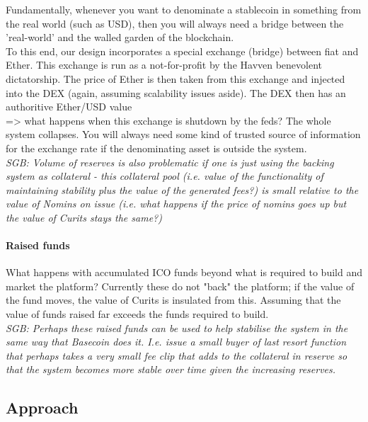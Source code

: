 \documentclass{article}
\begin{document}
\noindent Fundamentally, whenever you want to denominate a stablecoin in something from the real world (such as USD), then you will always need a bridge between the 'real-world' and the walled garden of the blockchain. \\

\noindent To this end, our design incorporates a special exchange (bridge) between fiat and Ether. This exchange is run as a not-for-profit by the Havven benevolent dictatorship. The price of Ether is then taken from this exchange and injected into the DEX (again, assuming scalability issues aside). The DEX then has an authoritive Ether/USD value  \\

\noindent => what happens when this exchange is shutdown by the feds? The whole system collapses. You will always need some kind of trusted source of information for the exchange rate if the denominating asset is outside the system. \\

\noindent \textit{SGB: Volume of reserves is also problematic if one is just using the backing system as collateral - this collateral pool (i.e. value of the functionality of maintaining stability plus the value of the generated fees?) is small relative to the value of Nomins on issue (i.e. what happens if the price of nomins goes up but the value of Curits stays the same?)} \\

\paragraph{Raised funds}

What happens with accumulated ICO funds beyond what is required to build and market the platform? Currently these do not "back" the platform; if the value of the fund moves, the value of Curits is insulated from this. Assuming that the value of funds raised far exceeds the funds required to build. \\

\noindent \textit{SGB: Perhaps these raised funds can be used to help stabilise the system in the same way that Basecoin does it. I.e. issue a small buyer of last resort function that perhaps takes a very small fee clip that adds to the collateral in reserve so that the system becomes more stable over time given the increasing reserves.}

\subsection{Approach}
\end{document}
